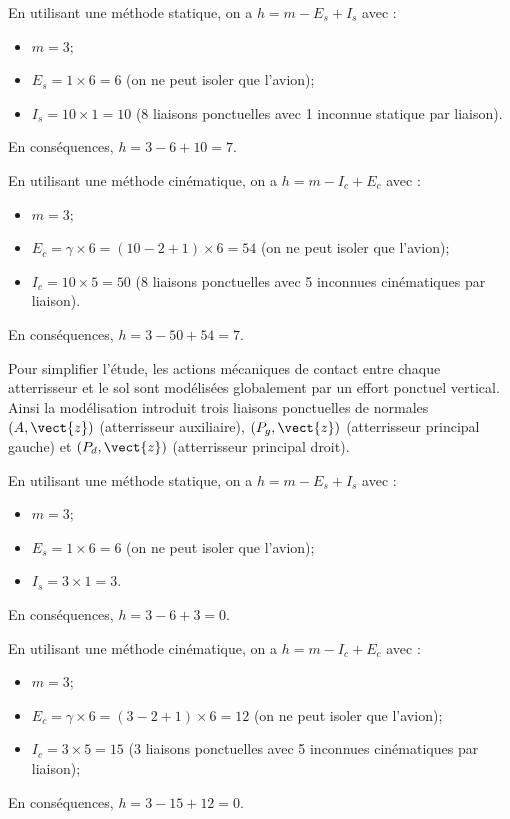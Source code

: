 En utilisant une méthode statique, on a $h=m-E_s+I_s$ avec : 
\begin{itemize}
\item  $m=3$;
\item $E_s = 1\times 6 = 6$ (on ne peut isoler que l'avion);
\item $I_s = 10 \times 1 = 10$ (8 liaisons ponctuelles avec 1 inconnue statique par liaison).
\end{itemize}
En conséquences, $h = 3-6+10 =7$. 

En utilisant une méthode cinématique, on a $h=m-I_c+E_c$ avec : 
\begin{itemize}
\item  $m=3$;
\item $E_c = \gamma \times 6 = (10-2+1) \times 6 = 54$ (on ne peut isoler que l'avion);
\item $I_c = 10 \times 5 = 50$ (8 liaisons ponctuelles avec 5 inconnues cinématiques par liaison).
\end{itemize}
En conséquences, $h = 3-50+54 =7$. 

\else 
\fi

Pour simplifier l’étude, les actions mécaniques de contact entre chaque atterrisseur et
le sol sont modélisées globalement par un effort ponctuel vertical. Ainsi la modélisation
introduit trois liaisons ponctuelles de normales $(A, \vect{z})$ (atterrisseur
auxiliaire), $(P_g, \vect{z})$ (atterrisseur principal gauche) et $(P_d, \vect{z})$ (atterrisseur principal droit).

\ifprof

En utilisant une méthode statique, on a $h=m-E_s+I_s$ avec : 
\begin{itemize}
\item  $m=3$;
\item $E_s = 1\times 6 = 6$ (on ne peut isoler que l'avion);
\item $I_s = 3 \times 1 = 3$.
\end{itemize}
En conséquences, $h = 3-6+3 =0$. 

En utilisant une méthode cinématique, on a $h=m-I_c+E_c$ avec : 
\begin{itemize}
\item  $m=3$;
\item $E_c = \gamma \times 6 = (3-2+1) \times 6 = 12$ (on ne peut isoler que l'avion);
\item $I_c = 3 \times 5 = 15$ (3 liaisons ponctuelles avec 5 inconnues cinématiques par liaison);
\end{itemize}
En conséquences, $h = 3-15+12 =0$. 


